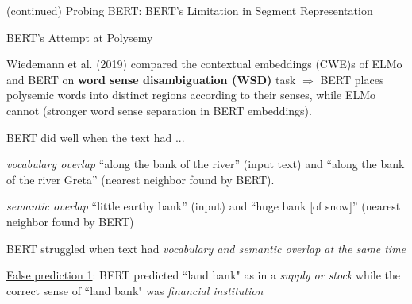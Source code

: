 \begin{frame}{(continued) Probing BERT: BERT's Limitation in Segment Representation}
\begin{figure}
\begin{minipage}{.47\textwidth}
      \label{fig:bertGradient}
    \end{minipage}
    \end{figure}

    
\end{frame}



\begin{frame}{BERT's Attempt at Polysemy}
    
    \begin{itemizeSpaced}{15pt}
    \linespread{0.3}
        \item Wiedemann et al. (2019) compared the contextual embeddings (CWE)s of ELMo and BERT on \textbf{word sense disambiguation (WSD)} task $\Rightarrow$ BERT places polysemic words into distinct regions according to their senses, while ELMo cannot (stronger word sense separation in BERT embeddings). 
        
        \item BERT did well when the text had ...
        \begin{itemizeSpaced}{7pt}
        \linespread{0.3}
            \item \textit{vocabulary overlap} {``along the bank of the river” (input text) and ``along the bank of the river Greta” (nearest neighbor found by BERT)}. 
            
            \item \textit{semantic overlap} {``little earthy bank” (input) and ``huge bank [of snow]” (nearest neighbor found by BERT)}
        \end{itemizeSpaced}
        
        \item BERT struggled when text had \emph{vocabulary and semantic overlap at the same time}
        \begin{itemizeSpaced}{7pt}
            \linespread{0.3}
            \item \underline{False prediction 1}: BERT predicted ``land bank" as in a \emph{supply or stock} while the correct sense of ``land bank" was \emph{financial institution}
            

\end{itemizeSpaced}
\end{itemizeSpaced}
\end{frame}

